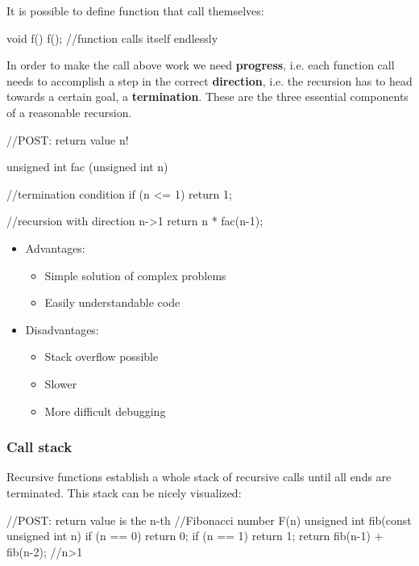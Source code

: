 \documentclass[10pt,a4paper]{scrartcl}
\begin{document}
\begin{multicols*}{2}
It is possible to define function that call themselves:

\begin{TPCpp}
void f(){
	f(); //function calls itself endlessly
}
\end{TPCpp}

In order to make the call above work we need \textbf{progress}, i.e. each function call needs to accomplish a step in the correct \textbf{direction}, i.e. the recursion has to head towards a certain goal, a \textbf{termination}. These are the three essential components of a reasonable recursion.

\begin{TPCpp}
//POST: return value n!

unsigned int fac (unsigned int n)
{
	//termination condition
	if (n <= 1) return 1;
	
	//recursion with direction n->1
	return n * fac(n-1);
}
\end{TPCpp}

\begin{itemize}
\item Advantages:
\begin{itemize}
\item Simple solution of complex problems
\item Easily understandable code
\end{itemize}
\item Disadvantages:
\begin{itemize}
\item Stack overflow possible
\item Slower
\item More difficult debugging
\end{itemize}
\end{itemize}

\subsubsection{Call stack}

Recursive functions establish a whole stack of recursive calls until all ends are terminated. This stack can be nicely visualized:

\begin{TPCpp}
//POST: return value is the n-th
//Fibonacci number F(n)
unsigned int fib(const unsigned int n){
	if (n == 0) return 0;
	if (n == 1) return 1;
	return fib(n-1) + fib(n-2); //n>1
}
\end{TPCpp}


\end{multicols*}
\end{document}
